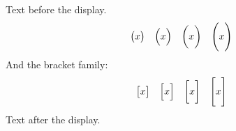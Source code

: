 \documentclass[12pt]{article}
\begin{document}
Text before the display.
\[
  \bigl( x \bigr) \quad \Bigl( x \Bigr) \quad \biggl( x \biggr)
  \quad \Biggl( x \Biggr)
\]
And the bracket family:
\[
  \bigl[ x \bigr] \quad \Bigl[ x \Bigr] \quad \biggl[ x \biggr]
  \quad \Biggl[ x \Biggr]
\]
Text after the display.
\end{document}
